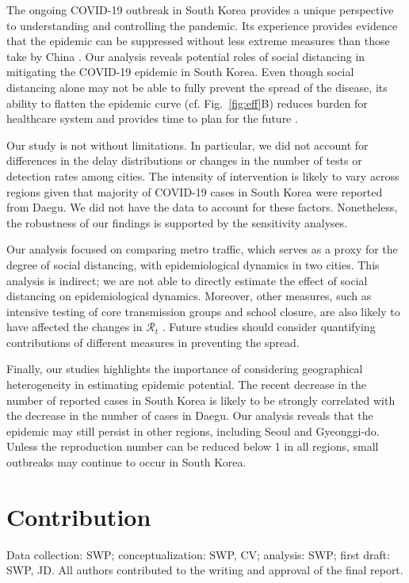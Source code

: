 \documentclass[12pt]{article}
\newcommand{\fref}[1]{Fig.~\ref{fig:#1}}
\begin{document}
The ongoing COVID-19 outbreak in South Korea provides a unique perspective to understanding and controlling the pandemic.
Its experience provides evidence that the epidemic can be suppressed without less extreme measures than those take by China \citep{kickbusch2020response}.
Our analysis reveals potential roles of social distancing in mitigating the COVID-19 epidemic in South Korea.
Even though social distancing alone may not be able to fully prevent the spread of the disease, its ability to flatten the epidemic curve (cf. \fref{eff}B) reduces burden for healthcare system and provides time to plan for the future \citep{anderson2020will}.

Our study is not without limitations.
In particular, we did not account for differences in the delay distributions or changes in the number of tests or detection rates among cities.
The intensity of intervention is likely to vary across regions given that majority of COVID-19 cases in South Korea were reported from Daegu.
We did not have the data to account for these factors.
Nonetheless, the robustness of our findings is supported by the sensitivity analyses.

Our analysis focused on comparing metro traffic, which serves as a proxy for the degree of social distancing, with epidemiological dynamics in two cities.
This analysis is indirect; we are not able to directly estimate the effect of social distancing on epidemiological dynamics.
Moreover, other measures, such as intensive testing of core transmission groups and school closure, are also likely to have affected the changes in $\mathcal R_t$ \citep{kcdc}.
Future studies should consider quantifying contributions of different measures in preventing the spread.

Finally, our studies highlights the importance of considering geographical heterogeneity in estimating epidemic potential.
The recent decrease in the number of reported cases in South Korea is likely to be strongly correlated with the decrease in the number of cases in Daegu.
Our analysis reveals that the epidemic may still persist in other regions, including Seoul and Gyeonggi-do.
Unless the reproduction number can be reduced below 1 in all regions, small outbreaks may continue to occur in South Korea.

\section*{Contribution}

Data collection: SWP; conceptualization: SWP, CV; analysis: SWP; first draft: SWP, JD. All authors contributed to the writing and approval of the final report.
\end{document}
